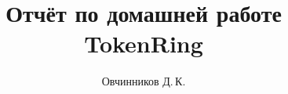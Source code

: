 \documentclass{mipt-thesis-bs}
\title{Отчёт по домашней работе TokenRing}
\author{Овчинников Д.\,К.}
\begin{document}
\frontmatter
\titlecontents
\end{document}
